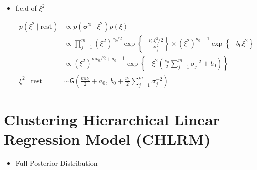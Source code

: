 \begin{appendix}
\begin{itemize}
\item f.c.d of $\xi^2$

\begin{equation}
\begin{split}
p(\xi^2 \mid \text{rest}) 
&\propto  p(\bm{\sigma^2}\mid 
\xi^2)
p(\xi) \\
&\propto \prod_{j=1}^{m} (\xi^2)^{\nu_0/2} 
\exp\left\{ -\frac{\nu_0 \xi^2 / 2}{\sigma_j^2} \right\}
\times (\xi^2)^{a_0 - 1} \exp\left\{ -b_0 \xi^2 \right\} \\[6pt]
&\propto (\xi^2)^{m \nu_0/2 + a_0 - 1} 
\exp\left\{ -\xi^2 \left( \frac{\nu_0}{2} \sum_{j=1}^{m} \sigma_j^{-2} + b_0 \right) \right\}\\
\xi^2 \mid \text{rest} &\sim \mathsf{G} \left(
\frac{m \nu_0}{2} + a_0,\ 
b_0 + \frac{\nu_0}{2} \sum_{j=1}^{m} \sigma_j^{-2}
\right)
\end{split}
\end{equation}

\end{itemize}

\newpage

\section{Clustering Hierarchical Linear Regression Model (CHLRM)}

\begin{itemize}

\item Full Posterior Distribution


\end{itemize}
\end{appendix}
